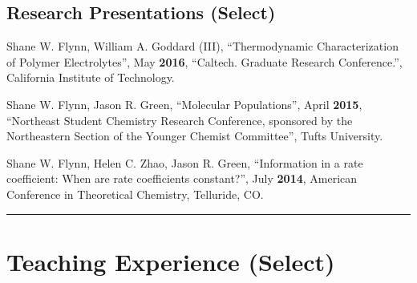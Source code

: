 \documentclass[letterpaper]{article}
\renewenvironment{itemize}{
  \begin{list}{}{
    \setlength{\leftmargin}{1.5em}
  }
}{
  \end{list}
}
\begin{document}
\subsection*{Research Presentations (Select)}

\begin{itemize}
\item Shane W. Flynn, William A. Goddard (III), ``Thermodynamic Characterization
      of Polymer Electrolytes'', May \textbf{2016}, ``Caltech. Graduate Research
      Conference.'', California Institute of Technology.

\item Shane W. Flynn, Jason R. Green, ``Molecular Populations'', April
      \textbf{2015}, ``Northeast Student Chemistry Research Conference,
      sponsored by the Northeastern Section of the Younger Chemist Committee'',
      Tufts University.

\item Shane W. Flynn, Helen C. Zhao, Jason R. Green, ``Information in a rate
      coefficient: When are rate coefficients constant?'', July \textbf{2014},
      American Conference in Theoretical Chemistry, Telluride, CO.

\end{itemize}

\vspace{0.1in}
\hrule

\section*{Teaching Experience (Select)}
\end{document}
